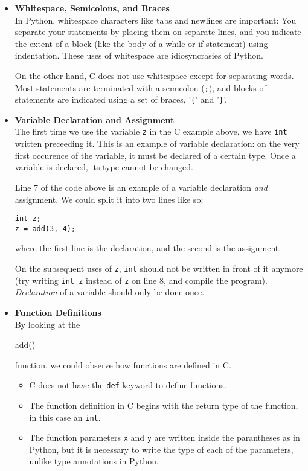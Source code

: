 \begin{itemize}
\item \textbf{Whitespace, Semicolons, and Braces}\\
In Python, whitespace characters like tabs and newlines are important: You separate your statements by placing them on separate lines, and you indicate the extent of a block (like the body of a while or if statement) using indentation. These uses of whitespace are idiosyncrasies of Python.

On the other hand, C does not use whitespace except for separating words. Most statements are terminated with a semicolon (\verb|;|), and blocks of statements are indicated using a set of braces, '\verb|{|' and '\verb|}|'.

\item \textbf{Variable Declaration and Assignment} \\
The first time we use the variable \verb|z| in the C example above, we have \verb|int| written preceeding it. This is an example of variable declaration: on the very first occurence of the variable, it must be declared of a certain type. Once a variable is declared, its type cannot be changed.

Line 7 of the code above is an example of a variable declaration \textit{and} assignment. We could split it into two lines like so:
\begin{verbatim}
int z;
z = add(3, 4);
\end{verbatim}
where the first line is the declaration, and the second is the assignment.

On the subsequent uses of \verb|z|, \verb|int| should not be written in front of it anymore (try writing \verb|int z| instead of \verb|z| on line 8, and compile the program). \textit{Declaration} of a variable should only be done once. 

\item \textbf{Function Definitions} \\
By looking at the \begin{typewriter}add()\end{typewriter} function, we could observe how functions are defined in C. 
\begin{itemize}
    \item C does not have the \verb|def| keyword to define functions.
    \item The function definition in C begins with the return type of the function, in this case an \verb|int|.
    \item The function parameters \verb|x| and \verb|y| are written inside the parantheses as in Python, but it is necessary to write the type of each of the parameters, unlike type annotations in Python.
\end{itemize}


\end{itemize}
